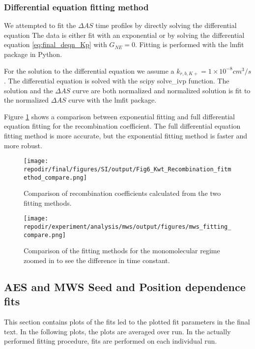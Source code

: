 \subsubsection{Differential equation fitting method }

We attempted to fit the $\Delta AS$ time profiles by directly solving the differential equation 
The data is either fit with an exponential or by solving the differential equation \ref{eq:final_deqn_Kp} with $G_{NE} =0$. Fitting is performed with the lmfit package in Python.

For the solution to the differential equation we assume a $k_{r,b,K+} = 1 \times 10^{-8} cm^3/s$ . The differential equation is solved with the scipy solve\_ivp function. The solution and the $\Delta AS$ curve are both normalized and normalized solution is fit to the normalized $\Delta AS$ curve with the lmfit package.


Figure \ref{fig:SI_Kwt_Recombination_fitmethod_compare} shows a comparison between exponential fitting and full differential equation fitting for the recombination coefficient. The full differential equation fitting method is more accurate, but the exponential fitting method is faster and more robust.  

\begin{figure}[]
\centering
\texttt{[image: \\repodir/final/figures/SI/output/Fig6\_Kwt\_Recombination\_fitmethod\_compare.png]}
\caption{Comparison of recombination coefficients calculated from the two fitting methods.}
\label{fig:SI_Kwt_Recombination_fitmethod_compare}
\end{figure}

\begin{figure}
\centering
\texttt{[image: \\repodir/experiment/analysis/mws/output/figures/mws\_fitting\_compare.png]}
\caption{Comparison of the fitting methods for the monomolecular regime zoomed in to see the difference in time constant. }
\label{fig:SI_mws_fitting_compare}
\end{figure}

\subsection{AES and MWS Seed and Position dependence fits}

This section contains plots of the fits led to the plotted fit parameters in the final text. In the following plots, the plots are averaged over run. In the actually performed fitting procedure, fits are performed on each individual run. 

